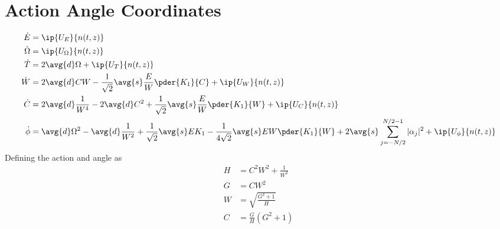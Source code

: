 \section{Action Angle Coordinates}


\begin{equation}
\begin{split}
 \dot{E} &=  \ip{U_E}{n(t,z)} \\
 \dot{\Omega} & =   \ip{U_\Omega}{n(t,z)} \\
 \dot{T} &=  2\avg{d} \Omega + \ip{ U_T }{ n(t,z)} \\
 \dot{W} &=  2 \avg{d} C W - \frac{1}{\sqrt{2}} \avg{s} \frac{E}{W} \pder{K_1}{C} + \ip{U_W}{ n(t,z)}\\ 
\dot{C} &= 2 \avg{d} \frac{1}{W^4}  - 2 \avg{d} C^2 + \frac{1}{\sqrt{2}}\avg{s} \frac{E}{W} \pder{K_1}{W} + \ip{U_C}{ n(t,z)}\\
\dot{\phi} &= \avg{d} \Omega^2 - \avg{d} \frac{1}{W^2} + \frac{1}{\sqrt{2}} \avg{s} E K_1 - \frac{1}{4\sqrt{2}} \avg{s} EW \pder{K_1}{W} + 2\avg{s}  \sum_{j=-N/2}^{N/2 - 1} |\alpha_j|^2 + \ip{U_{\phi}}{n(t,z)} \\
\end{split}
\end{equation}
Defining the action  and angle as
\begin{equation}
\begin{split}
H &= C^2 W^2 + \frac{1}{W^2}\\
G &= C W^2\\
W & = \sqrt{\frac{G^2+1}{H}}\\
C & = \frac{G}{H} \left(G^2+1\right)
\end{split}
\end{equation}
